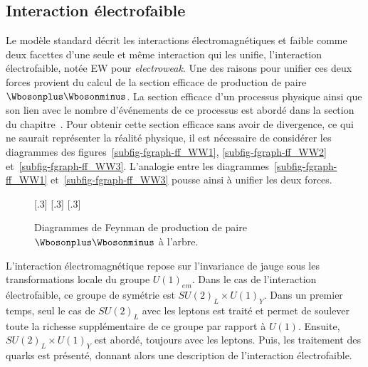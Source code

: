 \subsection{Interaction électrofaible}\label{chapter-MS-MSSM-section-formalisme-subsec-EW}
Le modèle standard décrit les interactions électromagnétiques et faible comme deux facettes d'une seule et même interaction qui les unifie, l'interaction électrofaible, notée \og EW \fg{} pour \emph{electroweak}.
Une des raisons pour unifier ces deux forces provient du calcul de la section efficace de production de paire $\Wbosonplus\Wbosonminus$.
La section efficace d'un processus physique ainsi que son lien avec le nombre d'événements de ce processus est abordé dans la section~ du chapitre~.
Pour obtenir cette section efficace sans avoir de divergence, ce qui ne saurait représenter la réalité physique, il est nécessaire de considérer les diagrammes des figures~\ref{subfig-fgraph-ff_WW1}, \ref{subfig-fgraph-ff_WW2} et~\ref{subfig-fgraph-ff_WW3}. L'analogie entre les diagrammes~\ref{subfig-fgraph-ff_WW1} et~\ref{subfig-fgraph-ff_WW3} pousse ainsi à unifier les deux forces.
\begin{figure}[h]
\centering
\vspace{\baselineskip}
\subcaptionbox{\label{subfig-fgraph-ff_WW1}}[.3\textwidth]
{\vspace{\baselineskip}}
\hfill
\subcaptionbox{\label{subfig-fgraph-ff_WW2}}[.3\textwidth]
{\vspace{\baselineskip}}
\hfill
\subcaptionbox{\label{subfig-fgraph-ff_WW3}}[.3\textwidth]
{\vspace{\baselineskip}}

\caption{Diagrammes de Feynman de production de paire $\Wbosonplus\Wbosonminus$ à l'arbre.}
\label{fig-fgraph-ff_WW}
\end{figure}
\par L'interaction électromagnétique repose sur l'invariance de jauge sous les transformations locale du groupe $U(1)_{em}$.
Dans le cas de l'interaction électrofaible, ce groupe de symétrie est $SU(2)_L \times U(1)_Y$. Dans un premier temps, seul le cas de $SU(2)_L$ avec les leptons est traité et permet de soulever toute la richesse supplémentaire de ce groupe par rapport à $U(1)$. Ensuite, $SU(2)_L \times U(1)_Y$ est abordé, toujours avec les leptons. Puis, les traitement des quarks est présenté, donnant alors une description de l'interaction électrofaible.
